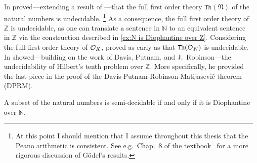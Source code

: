 In \citeyear{Rosser1936} \textcite{Rosser1936} proved---extending a result of
\textcite{Goedel1931}---that the full first order theory
\(\mathtt{Th}(\mathfrak{N})\) of the natural numbers is undecidable.%
\footnote{At this point I should mention that I assume throughout this thesis
that the Peano arithmetic is consistent. See e.g.\ Chap.~8 of the
textbook~\cite{Cooper2004} for a more rigorous discussion of Gödel's results.}
As a consequence, the full first order theory of \(ℤ\) is undecidable, as one
can translate a sentence in \(ℕ\) to an equivalent sentence in \(ℤ\) via the
construction described in \cref{ex:N is Diophantine over Z}. Considering the
full first order theory of \(\mathcal{O}_{K}\), \textcite{Robinson1959} proved as early
as \citeyear{Robinson1959} that \(\mathtt{Th}(\mathfrak{O}_{K})\) is undecidable. In
\citeyear{Matijasevic1970} \textcite{Matijasevic1970} showed---building on the
work of Davis, Putnam, and J.~Robinson---the undecidability of Hilbert's tenth
problem over \(ℤ\). More specifically, he provided the last piece in the proof
of the Davis-Putnam-Robinson-Matijasevič theorem (\textsc{DPRM}).

\begin{thm}\label{thm:DPRM}
  A subset of the natural numbers is semi-decidable if and only if it is
  Diophantine over \(ℕ\).
\end{thm}

